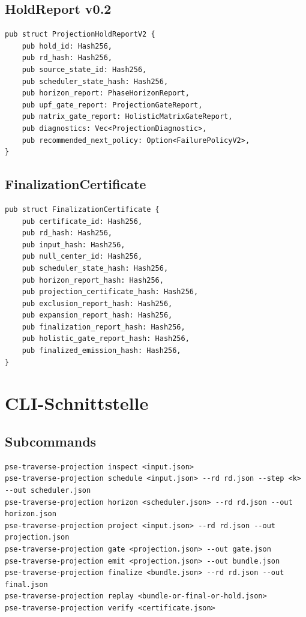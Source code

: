 \documentclass[11pt,a4paper]{article}
\begin{document}
\subsection{HoldReport v0.2}
\begin{lstlisting}
pub struct ProjectionHoldReportV2 {
    pub hold_id: Hash256,
    pub rd_hash: Hash256,
    pub source_state_id: Hash256,
    pub scheduler_state_hash: Hash256,
    pub horizon_report: PhaseHorizonReport,
    pub upf_gate_report: ProjectionGateReport,
    pub matrix_gate_report: HolisticMatrixGateReport,
    pub diagnostics: Vec<ProjectionDiagnostic>,
    pub recommended_next_policy: Option<FailurePolicyV2>,
}
\end{lstlisting}

\subsection{FinalizationCertificate}
\begin{lstlisting}
pub struct FinalizationCertificate {
    pub certificate_id: Hash256,
    pub rd_hash: Hash256,
    pub input_hash: Hash256,
    pub null_center_id: Hash256,
    pub scheduler_state_hash: Hash256,
    pub horizon_report_hash: Hash256,
    pub projection_certificate_hash: Hash256,
    pub exclusion_report_hash: Hash256,
    pub expansion_report_hash: Hash256,
    pub finalization_report_hash: Hash256,
    pub holistic_gate_report_hash: Hash256,
    pub finalized_emission_hash: Hash256,
}
\end{lstlisting}

\section{CLI-Schnittstelle}

\subsection{Subcommands}
\begin{lstlisting}
pse-traverse-projection inspect <input.json>
pse-traverse-projection schedule <input.json> --rd rd.json --step <k> --out scheduler.json
pse-traverse-projection horizon <scheduler.json> --rd rd.json --out horizon.json
pse-traverse-projection project <input.json> --rd rd.json --out projection.json
pse-traverse-projection gate <projection.json> --out gate.json
pse-traverse-projection emit <projection.json> --out bundle.json
pse-traverse-projection finalize <bundle.json> --rd rd.json --out final.json
pse-traverse-projection replay <bundle-or-final-or-hold.json>
pse-traverse-projection verify <certificate.json>
\end{lstlisting}
\end{document}
